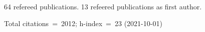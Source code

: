 64 refereed publications. 13 refeered publications as first author.

Total citations~=~2012; h-index~=~23 (2021-10-01)